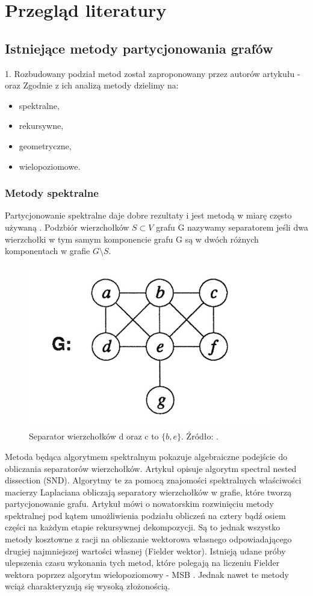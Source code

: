 \newpage


\section{Przegląd literatury}
\label{sec:literature}

\subsection{Istniejące metody partycjonowania grafów}

1. Rozbudowany podział metod został zaproponowany przez autorów artykułu - \cite{metis}
oraz \cite{1364754}
Zgodnie z ich analizą metody dzielimy na:
\begin{itemize}
    \item spektralne,
    \item rekursywne,
    \item geometryczne,
    \item wielopoziomowe.
\end{itemize}

\subsubsection{Metody spektralne}
Partycjonowanie spektralne daje dobre rezultaty i jest metodą w miarę często używaną
\cite{10.1137/0611030, 10.5555/147877.147902, improved_spectral}.
Podzbiór wierzchołków \(S \subset V\) grafu G nazywamy separatorem jeśli dwa wierzchołki w tym samym komponencie
grafu G są w dwóch różnych komponentach w grafie  \(G \setminus S\).

\begin{figure}[h]
    \centering
    \includegraphics[width=0.3\linewidth]{images/separator}
    \caption{Separator wierzchołków d oraz c to \(\{b, e\}\).
    Źródło: \cite{MiTeThVa93}.}
    \label{im:separator}
\end{figure}

Metoda \cite{10.1137/0611030} będąca algorytmem spektralnym pokazuje algebraiczne podejście do obliczania
separatorów wierzchołków.
Artykuł \cite{10.5555/147877.147902} opisuje algorytm spectral nested dissection (SND).
Algorytmy te za pomocą znajomości spektralnych właściwości macierzy Laplaciana obliczają separatory wierzchołków w grafie,
które tworzą partycjonowanie grafu.
Artykuł \cite{improved_spectral} mówi o nowatorskim rozwinięciu metody spektralnej pod kątem umożliwienia podziału
obliczeń na cztery bądź osiem części na każdym etapie rekursywnej dekompozycji.
Są to jednak wszystko metody kosztowne z racji na
obliczanie wektorowa własnego odpowiadającego drugiej najmniejszej wartości własnej (Fielder wektor).
Istnieją udane próby ulepszenia czasu wykonania tych metod, które polegają na liczeniu Fielder wektora poprzez
algorytm wielopoziomowy - MSB \cite{fast_multilevel}. Jednak nawet te metody wciąż charakteryzują się wysoką złożonością.


